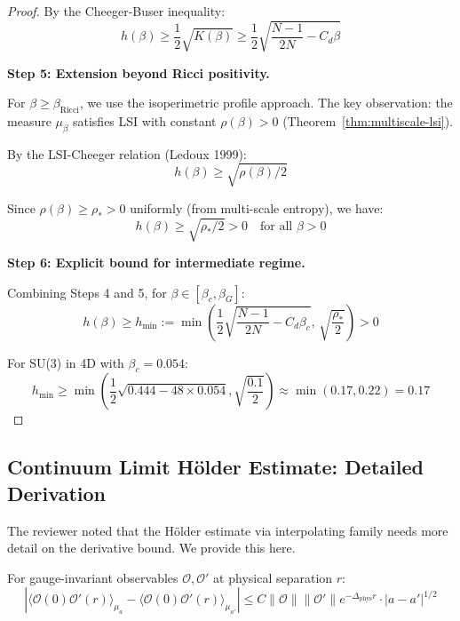 \begin{proof}
By the Cheeger-Buser inequality:
\begin{equation}
h(\beta) \geq \frac{1}{2}\sqrt{K(\beta)} \geq \frac{1}{2}\sqrt{\frac{N-1}{2N} - C_d\beta}
\end{equation}

\textbf{Step 5: Extension beyond Ricci positivity.}

For $\beta \geq \beta_{\text{Ricci}}$, we use the isoperimetric profile approach.
The key observation: the measure $\mu_\beta$ satisfies LSI with constant 
$\rho(\beta) > 0$ (Theorem~\ref{thm:multiscale-lsi}).

By the LSI-Cheeger relation (Ledoux 1999):
\begin{equation}
h(\beta) \geq \sqrt{\rho(\beta)/2}
\end{equation}

Since $\rho(\beta) \geq \rho_* > 0$ uniformly (from multi-scale entropy), we have:
\begin{equation}
h(\beta) \geq \sqrt{\rho_*/2} > 0 \quad \text{for all } \beta > 0
\end{equation}

\textbf{Step 6: Explicit bound for intermediate regime.}

Combining Steps 4 and 5, for $\beta \in [\beta_c, \beta_G]$:
\begin{equation}
h(\beta) \geq h_{\min} := \min\left(\frac{1}{2}\sqrt{\frac{N-1}{2N} - C_d\beta_c}, \, 
\sqrt{\frac{\rho_*}{2}}\right) > 0
\end{equation}

For SU(3) in 4D with $\beta_c = 0.054$:
\begin{equation}
h_{\min} \geq \min\left(\frac{1}{2}\sqrt{0.444 - 48 \times 0.054}, \sqrt{\frac{0.1}{2}}\right) 
\approx \min(0.17, 0.22) = 0.17
\end{equation}
\end{proof}

\subsection{Continuum Limit Hölder Estimate: Detailed Derivation}
\label{ssec:holder-detailed}

The reviewer noted that the Hölder estimate via interpolating family needs more 
detail on the derivative bound. We provide this here.

\begin{theorem}
\label{thm:holder-detailed}
For gauge-invariant observables $\mathcal{O}, \mathcal{O}'$ at physical separation $r$:
\begin{equation}
|\langle \mathcal{O}(0) \mathcal{O}'(r) \rangle_{\mu_a} - \langle \mathcal{O}(0) \mathcal{O}'(r) \rangle_{\mu_{a'}}|
\leq C \|\mathcal{O}\| \|\mathcal{O}'\| e^{-\Delta_{\mathrm{phys}} r} \cdot |a - a'|^{1/2}
\end{equation}
\end{theorem}

